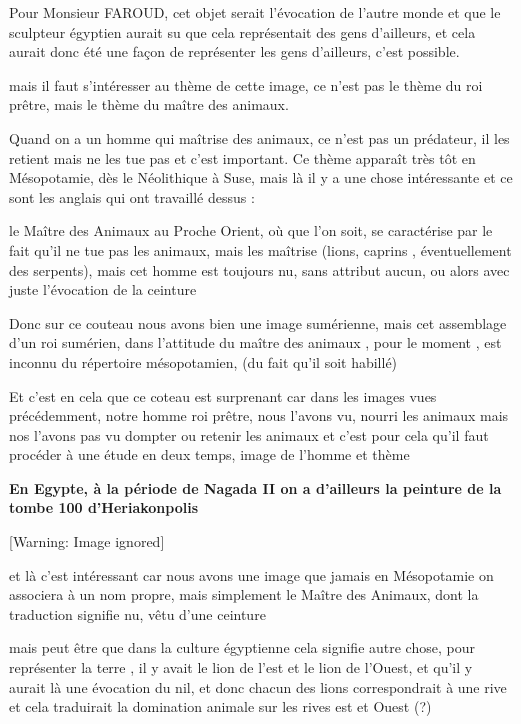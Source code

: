 \documentclass[a4paper,10pt]{article}
\begin{document}
Pour Monsieur FAROUD, cet objet serait l'évocation de
l'autre monde et que le sculpteur égyptien aurait su
que cela représentait des gens d'ailleurs,  et cela
aurait donc été une façon de représenter les gens
d'ailleurs, c'est possible.

mais il faut s'intéresser au thème de cette image, ce
n'est pas le thème du roi prêtre, mais le thème du
maître des animaux.

Quand on a un homme qui maîtrise des animaux, ce n'est
pas un prédateur, il les retient mais ne les tue pas et
c'est important. Ce thème apparaît très tôt en
Mésopotamie, dès le Néolithique à Suse, mais là il y a une chose
intéressante et ce sont les anglais qui ont travaillé dessus : 

le Maître des Animaux au Proche Orient, où que l'on
soit, se caractérise par le fait qu'il ne tue pas les
animaux,  mais les maîtrise (lions, caprins , éventuellement des
serpents), mais cet homme est toujours nu, sans attribut aucun, ou
alors avec juste l'évocation de la ceinture 

Donc sur ce couteau nous avons bien une image sumérienne, mais cet
assemblage d'un roi sumérien, dans
l'attitude du maître des animaux , pour le moment ,
est inconnu du répertoire mésopotamien, (du fait qu'il
soit habillé)

Et c'est en cela que ce coteau est surprenant car dans
les images vues précédemment, notre homme roi prêtre, nous
l'avons vu, nourri les animaux mais nos
l'avons pas vu dompter ou retenir les animaux  et
c'est pour cela qu'il faut procéder à
une étude en deux temps, image de l'homme et thème

\textbf{En Egypte, à la période de Nagada II on a
d'ailleurs la peinture de la tombe 100
d'Heriakonpolis}

  [Warning: Image ignored] %
 

et là c'est intéressant car nous avons une image que
jamais en  Mésopotamie on associera à un nom propre, mais simplement le
Maître des Animaux, dont la traduction signifie nu, vêtu
d'une ceinture 

mais peut être que dans la culture égyptienne cela signifie autre chose,
pour représenter la terre , il y avait le lion de
l'est et le lion de l'Ouest,  et
qu'il y aurait là une évocation du nil, et donc chacun
des lions correspondrait à une rive et cela traduirait la domination
animale sur les rives est et Ouest (?)
\end{document}
